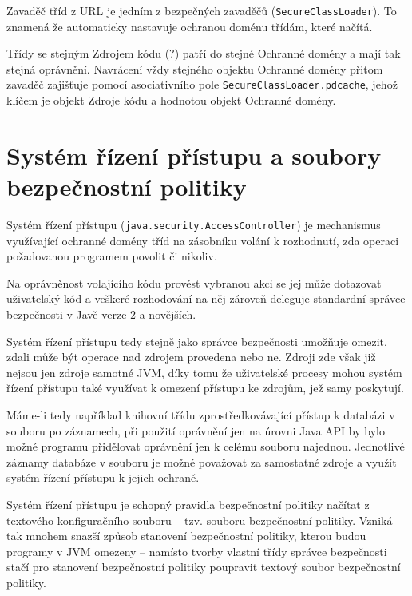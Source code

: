 Zavaděč tříd z URL je jedním z bezpečných zavaděčů ({\tt SecureClassLoader}). To znamená že automaticky nastavuje ochranou doménu třídám, které načítá.

Třídy se stejným Zdrojem kódu (?) patří do stejné Ochranné domény a mají tak stejná oprávnění. Navrácení vždy stejného objektu Ochranné domény přitom zavaděč zajišťuje pomocí asociativního pole {\tt SecureClassLoader.pdcache}, jehož klíčem je objekt Zdroje kódu a hodnotou objekt Ochranné domény. \cite{sourceSecureClassLoader}

\section{Systém řízení přístupu a soubory bezpečnostní politiky}

Systém řízení přístupu ({\tt java.security.AccessController}) je mechanismus využívající ochranné domény tříd na zásobníku volání k rozhodnutí, zda operaci požadovanou programem povolit či nikoliv. 

Na oprávněnost volajícího kódu provést vybranou akci se jej může dotazovat uživatelský kód a veškeré rozhodování na něj zároveň deleguje standardní správce bezpečnosti v Javě verze 2 a novějších. \cite[5]{oaks}

Systém řízení přístupu tedy stejně jako správce bezpečnosti umožňuje omezit, zdali může být operace nad zdrojem provedena nebo ne. Zdroji zde však již nejsou jen zdroje samotné JVM, díky tomu že uživatelské procesy mohou systém řízení přístupu také využívat k omezení přístupu ke zdrojům, jež samy poskytují. \cite[5]{oaks}

Máme-li tedy například knihovní třídu zprostředkovávající přístup k databázi v souboru po záznamech, při použití oprávnění jen na úrovni Java API by bylo možné programu přidělovat oprávnění jen k celému souboru najednou. Jednotlivé záznamy databáze v souboru je možné považovat za samostatné zdroje a využít systém řízení přístupu k jejich ochraně.

Systém řízení přístupu je schopný pravidla bezpečnostní politiky načítat z textového konfiguračního souboru -- tzv. souboru bezpečnostní politiky. Vzniká tak mnohem snazší způsob stanovení bezpečnostní politiky, kterou budou programy v JVM omezeny -- namísto tvorby vlastní třídy správce bezpečnosti stačí pro stanovení bezpečnostní politiky poupravit textový soubor bezpečnostní politiky. \cite[5]{oaks}

